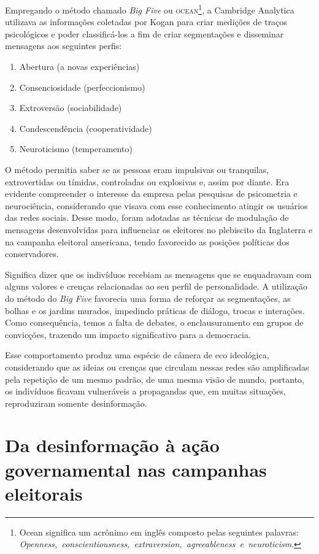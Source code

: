 Empregando o método chamado \textit{Big Five} ou \textsc{ocean}\footnote{Ocean
  significa um acrônimo em inglês composto pelas seguintes palavras: \textit{Openness,~conscientiousness,~extraversion,~agreeableness~e~neuroticism}.},
a Cambridge Analytica utilizava as informações coletadas por Kogan para
criar medições de traços psicológicos e poder classificá-los a fim de criar segmentações e disseminar mensagens aos seguintes perfis:

\begin{enumerate}
\item Abertura (a novas experiências)
\item Consenciosidade (perfeccionismo)
\item Extroversão (sociabilidade)
\item Condescendência (cooperatividade)
\item Neuroticismo (temperamento)
\end{enumerate}

O método permitia saber se as pessoas eram impulsivas ou tranquilas,
extrovertidas ou tímidas, controladas ou explosivas e, assim por diante.
Era evidente compreender o interesse da empresa pelas pesquisas de
psicometria e neurociência, considerando que visava com esse
conhecimento atingir os usuários das redes sociais. Desse modo, foram
adotadas as técnicas de modulação de mensagens desenvolvidas para
influenciar os eleitores no plebiscito da Inglaterra e na campanha
eleitoral americana, tendo favorecido as posições políticas dos
conservadores.

Significa dizer que os indivíduos recebiam as mensagens que se
enquadravam com alguns valores e crenças relacionadas ao seu perfil de
personalidade. A utilização do método do \textit{Big Five} favorecia uma forma de
reforçar as segmentações, as bolhas e os jardins murados, impedindo
práticas de diálogo, trocas e interações. Como consequência, temos a
falta de debates, o enclausuramento em grupos de convicções, trazendo um
impacto significativo para a democracia.

Esse comportamento produz uma espécie de câmera de eco ideológica,
considerando que as ideias ou crenças que circulam nessas redes são
amplificadas pela repetição de um mesmo padrão, de uma mesma visão de
mundo, portanto, os indivíduos ficavam vulneráveis a propagandas que, em
muitas situações, reproduziram somente desinformação.

\section{Da desinformação à ação governamental nas campanhas eleitorais}

